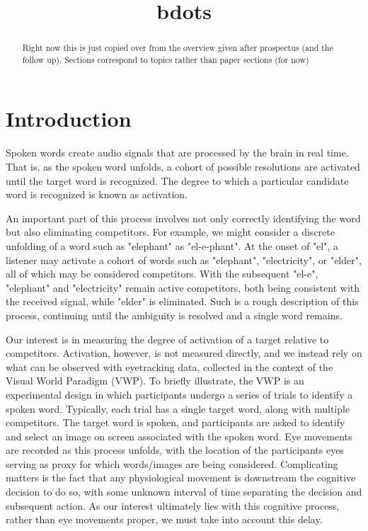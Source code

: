 \documentclass{article}
\title{bdots}
\date{}
\begin{document}

\maketitle

%

\begin{abstract}
Right now this is just copied over from the overview given after prospectus (and the follow up). Sections correspond to topics rather than paper sections (for now)
\end{abstract}

\section{Introduction}
Spoken words create audio signals that are processed by the brain in real time. That is, as the spoken word unfolds, a cohort of possible resolutions are activated until the target word is recognized. The degree to which a particular candidate word is recognized is known as activation.

An important part of this process involves not only correctly identifying the word but also eliminating competitors. For example, we might consider a discrete unfolding of a word such as "elephant" as  "el-e-phant". At the onset of "el", a listener may activate a cohort of words such as "elephant", "electricity", or "elder", all of which may be considered competitors. With the subsequent "el-e", "elephant" and "electricity" remain active competitors, both being consistent with the received signal, while "elder" is eliminated. Such is a rough description of this process, continuing until the ambiguity is resolved and a single word remains.

Our interest is in measuring the degree of activation of a target relative to competitors. Activation, however, is not measured directly, and we instead rely on what can be observed with eyetracking data, collected in the context of the Visual World Paradigm (VWP). To briefly illustrate, the VWP is an experimental design in which participants undergo a series of trials to identify a spoken word. Typically, each trial has a single target word, along with multiple competitors. The target word is spoken, and participants are asked to identify and select an image on screen associated with the spoken word. Eye movements are recorded as this process unfolds, with the location of the participants eyes serving as proxy for which words/images are being considered. Complicating matters is the fact that any physiological movement is downstream the cognitive decision to do so, with some unknown interval of time separating the decision and subsequent action. As our interest ultimately lies with this cognitive process, rather than eye movements proper, we must take into account this delay.
\end{document}
